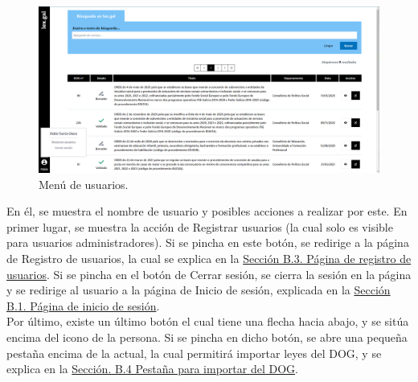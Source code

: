 \begin{figure}[H]
\centerline{\includegraphics[width=15cm]{figuras/manualUsuario/OpcionesUsuario.PNG}}
\caption{Menú de usuarios.}
\label{enlacePMenuUsuarios}
\end{figure}

En él, se muestra el nombre de usuario y posibles acciones a realizar por este. En primer lugar, se muestra la acción de Registrar usuarios (la cual solo es visible para usuarios administradores). Si se pincha en este botón, se redirige a la página de Registro de usuarios, la cual se explica en la \hyperref[PInicioSesion]{Sección B.3. Página de registro de usuarios}. Si se pincha en el botón de Cerrar sesión, se cierra la sesión en la página y se redirige al usuario a la página de Inicio de sesión, explicada en la \hyperref[PInicioSesion]{Sección B.1. Página de inicio de sesión}.
\\

Por último, existe un último botón el cual tiene una flecha hacia abajo, y se sitúa encima del icono de la persona. Si se pincha en dicho botón, se abre una pequeña pestaña encima de la actual, la cual permitirá importar leyes del DOG, y se explica en la \hyperref[PBusquedaDOG]{Sección. B.4 Pestaña para importar del DOG}.